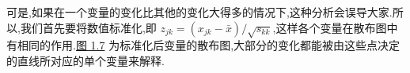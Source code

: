 可是,如果在一个变量的变化比其他的变化大得多的情况下,这种分析会误导大家.所以,我们首先要将数值标准化,即 $z_{jk} = (x_{jk} - \bar{x})/\sqrt{s_{kk}}$,这样各个变量在散布图中有相同的作用.\hyperref[fig:1.7]{图 1.7} 为标准化后变量的散布图,大部分的变化都能被由这些点决定的直线所对应的单个变量来解释.

\begin{mvfigure}
\label{fig:1.6}
\end{mvfigure}

\begin{mvfigure}
\label{fig:1.7}
\end{mvfigure}

